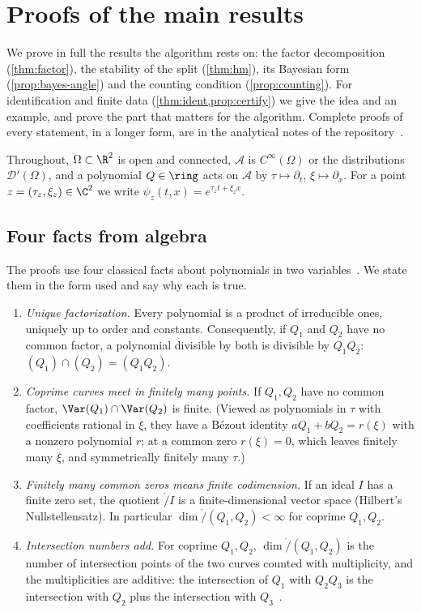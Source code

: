 \section{Proofs of the main results}\label{sm:proofs}
We prove in full the results the algorithm rests on: the factor decomposition (\cref{thm:factor}), the stability of the
split (\cref{thm:hm}), its Bayesian form (\cref{prop:bayes-angle}) and the counting condition (\cref{prop:counting}).
For identification and finite data (\cref{thm:ident,prop:certify}) we give the idea and an example, and prove the part
that matters for the algorithm. Complete proofs of every statement, in a longer form, are in the analytical notes of the
repository~\cite{Pri26code}.

Throughout, $\Omega\subset\R^2$ is open and connected, $\mathcal A$ is $C^\infty(\Omega)$ or the distributions
$\mathcal D'(\Omega)$, and a polynomial $Q\in\ring$ acts on $\mathcal A$ by $\tau\mapsto\partial_t$, $\xi\mapsto\partial_x$.
For a point $z=(\tau_z,\xi_z)\in\C^2$ we write $\psi_z(t,x)=e^{\tau_zt+\xi_zx}$.

\subsection{Four facts from algebra}\label{sm:algebra}
The proofs use four classical facts about polynomials in two variables~\cite{CLO15,Ful08}. We state them in the form
used and say why each is true.
\begin{enumerate}[label=(F\arabic*), leftmargin=*]
\item \emph{Unique factorization.} Every polynomial is a product of irreducible ones, uniquely up to order and constants.
Consequently, if $Q_1$ and $Q_2$ have no common factor, a polynomial divisible by both is divisible by $Q_1Q_2$:
$(Q_1)\cap(Q_2)=(Q_1Q_2)$.
\item \emph{Coprime curves meet in finitely many points.} If $Q_1,Q_2$ have no common factor, $\Var(Q_1)\cap\Var(Q_2)$ is
finite. (Viewed as polynomials in $\tau$ with coefficients rational in $\xi$, they have a B\'ezout identity
$aQ_1+bQ_2=r(\xi)$ with a nonzero polynomial $r$; at a common zero $r(\xi)=0$, which leaves finitely many $\xi$, and
symmetrically finitely many $\tau$.)
\item \emph{Finitely many common zeros means finite codimension.} If an ideal $I$ has a finite zero set, the quotient
$\ring/I$ is a finite-dimensional vector space (Hilbert's Nullstellensatz). In particular $\dim\ring/(Q_1,Q_2)<\infty$
for coprime $Q_1,Q_2$.
\item \emph{Intersection numbers add.} For coprime $Q_1,Q_2$, $\dim\ring/(Q_1,Q_2)$ is the number of intersection points of
the two curves counted with multiplicity, and the multiplicities are additive: the intersection of $Q_1$ with $Q_2Q_3$
is the intersection with $Q_2$ plus the intersection with $Q_3$~\cite[Ch.~3]{Ful08}.
\end{enumerate}

